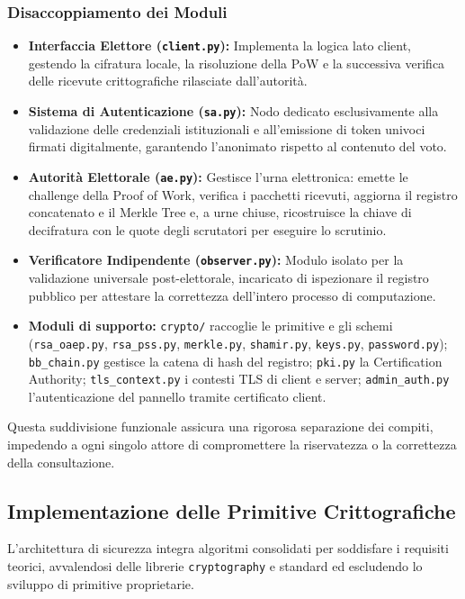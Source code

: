 \documentclass[12pt,a4paper]{article}
\begin{document}
\subsubsection{Disaccoppiamento dei Moduli}

\begin{itemize}
  \item \textbf{Interfaccia Elettore (\texttt{client.py}):} Implementa la logica lato client, gestendo la cifratura locale, la risoluzione della PoW e la successiva verifica delle ricevute crittografiche rilasciate dall'autorità.
  \item \textbf{Sistema di Autenticazione (\texttt{sa.py}):} Nodo dedicato esclusivamente alla validazione delle credenziali istituzionali e all'emissione di token univoci firmati digitalmente, garantendo l'anonimato rispetto al contenuto del voto.
  \item \textbf{Autorità Elettorale (\texttt{ae.py}):} Gestisce l'urna elettronica: emette le challenge della Proof of Work, verifica i pacchetti ricevuti, aggiorna il registro concatenato e il Merkle Tree e, a urne chiuse, ricostruisce la chiave di decifratura con le quote degli scrutatori per eseguire lo scrutinio.
  \item \textbf{Verificatore Indipendente (\texttt{observer.py}):} Modulo isolato per la validazione universale post-elettorale, incaricato di ispezionare il registro pubblico per attestare la correttezza dell'intero processo di computazione.
  \item \textbf{Moduli di supporto:} \texttt{crypto/} raccoglie le primitive e gli schemi (\texttt{rsa\_oaep.py}, \texttt{rsa\_pss.py}, \texttt{merkle.py}, \texttt{shamir.py}, \texttt{keys.py}, \texttt{password.py}); \texttt{bb\_chain.py} gestisce la catena di hash del registro; \texttt{pki.py} la Certification Authority; \texttt{tls\_context.py} i contesti TLS di client e server; \texttt{admin\_auth.py} l'autenticazione del pannello tramite certificato client.
\end{itemize}

Questa suddivisione funzionale assicura una rigorosa separazione dei compiti, impedendo a ogni singolo attore di compromettere la riservatezza o la correttezza della consultazione.

\subsection{Implementazione delle Primitive Crittografiche}

L'architettura di sicurezza integra algoritmi consolidati per soddisfare i requisiti teorici, avvalendosi delle librerie \texttt{cryptography} e standard ed escludendo lo sviluppo di primitive proprietarie.
\end{document}
